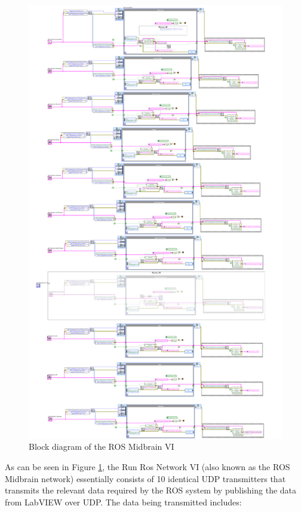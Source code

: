 \begin{figure}[h!]
\centering
\includegraphics[scale=0.35]{Photos/rosmidbrain.png}
\caption{Block diagram of the ROS Midbrain VI}
\label{fig:rosmidbrain}
\end{figure}

\noindent As can be seen in Figure \ref{fig:rosmidbrain}, the Run Ros Network VI (also known as the ROS Midbrain network) essentially consists of 10 identical UDP transmitters that transmits the relevant data required by the ROS system by publishing the data from LabVIEW over UDP. The data being transmitted includes:

